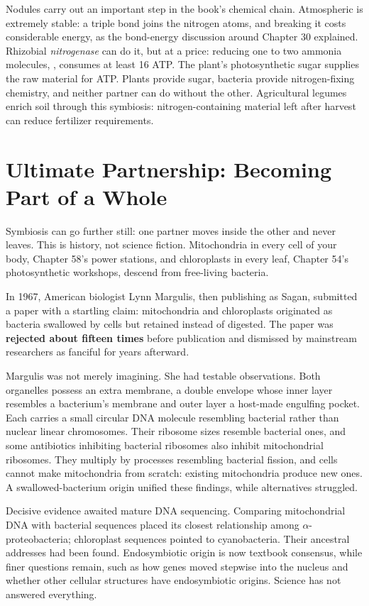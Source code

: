 Nodules carry out an important step in the book's chemical chain. Atmospheric  is extremely stable: a triple bond joins the nitrogen atoms, and breaking it costs considerable energy, as the bond-energy discussion around Chapter 30 explained. Rhizobial \emph{nitrogenase} can do it, but at a price: reducing one  to two ammonia molecules, , consumes at least 16 ATP. The plant's photosynthetic sugar supplies the raw material for ATP. Plants provide sugar, bacteria provide nitrogen-fixing chemistry, and neither partner can do without the other. Agricultural legumes enrich soil through this symbiosis: nitrogen-containing material left after harvest can reduce fertilizer requirements.

\section{Ultimate Partnership: Becoming Part of a Whole}

Symbiosis can go further still: one partner moves inside the other and never leaves. This is history, not science fiction. Mitochondria in every cell of your body, Chapter 58's power stations, and chloroplasts in every leaf, Chapter 54's photosynthetic workshops, descend from free-living bacteria.

\begin{zhengju}
In 1967, American biologist Lynn Margulis, then publishing as Sagan, submitted a paper with a startling claim: mitochondria and chloroplasts originated as bacteria swallowed by cells but retained instead of digested. The paper was \textbf{rejected about fifteen times} before publication and dismissed by mainstream researchers as fanciful for years afterward.

Margulis was not merely imagining. She had testable observations. Both organelles possess an extra membrane, a double envelope whose inner layer resembles a bacterium's membrane and outer layer a host-made engulfing pocket. Each carries a small circular DNA molecule resembling bacterial rather than nuclear linear chromosomes. Their ribosome sizes resemble bacterial ones, and some antibiotics inhibiting bacterial ribosomes also inhibit mitochondrial ribosomes. They multiply by processes resembling bacterial fission, and cells cannot make mitochondria from scratch: existing mitochondria produce new ones. A swallowed-bacterium origin unified these findings, while alternatives struggled.

Decisive evidence awaited mature DNA sequencing. Comparing mitochondrial DNA with bacterial sequences placed its closest relationship among $\alpha$-proteobacteria; chloroplast sequences pointed to cyanobacteria. Their ancestral addresses had been found. Endosymbiotic origin is now textbook consensus, while finer questions remain, such as how genes moved stepwise into the nucleus and whether other cellular structures have endosymbiotic origins. Science has not answered everything.
\end{zhengju}

